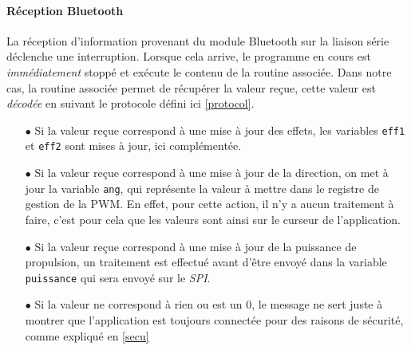			\paragraph{Réception Bluetooth} La réception d'information provenant du module Bluetooth sur la liaison série déclenche une interruption. Lorsque cela arrive, le programme en cours est \textit{immédiatement} stoppé et exécute le contenu de la routine associée. Dans notre cas, la routine associée permet de récupérer la valeur reçue, cette valeur est \textit{décodée} en suivant le protocole défini ici \ref{protocol}.
			\begin{itemize}
			\item[$\bullet$] Si la valeur reçue correspond à une mise à jour des effets, les variables \texttt{eff1} et \texttt{eff2} sont mises à jour, ici complémentée. 
			\item[$\bullet$] Si la valeur reçue correspond à une mise à jour de la direction, on met à jour la variable \texttt{ang}, qui représente la valeur à mettre dans le registre de gestion de la PWM. En effet, pour cette action, il n'y a aucun traitement à faire, c'est pour cela que les valeurs sont ainsi sur le curseur de l'application.
			\item[$\bullet$] Si la valeur reçue correspond à une mise à jour de la puissance de propulsion, un traitement est effectué avant d'être envoyé dans la variable \texttt{puissance} qui sera envoyé sur le \textit{SPI}.
			\item[$\bullet$] Si la valeur ne correspond à rien ou est un 0, le message ne sert juste à montrer que l'application est toujours connectée pour des raisons de sécurité, comme expliqué en \ref{secu}			
			\end{itemize}			 
